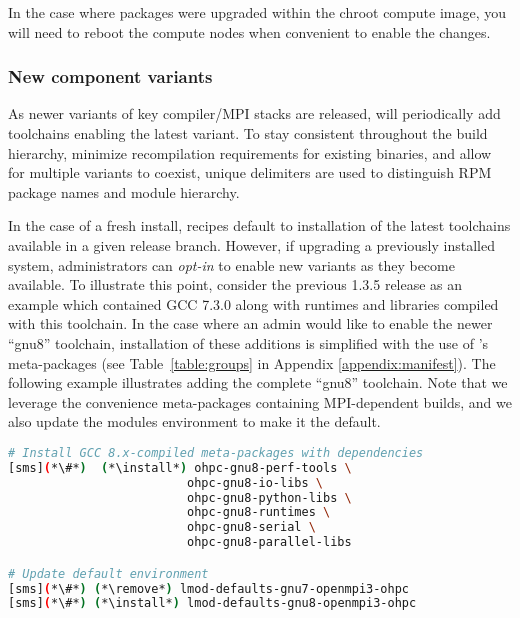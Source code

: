 \noindent In the case where packages were upgraded within the chroot compute image,
you will need to reboot the compute nodes when convenient to enable the
changes.

\subsubsection{New component variants}

As newer variants of key compiler/MPI stacks are released, \OHPC{} will
periodically add toolchains enabling the latest variant. To stay consistent
throughout the build hierarchy, minimize recompilation requirements for existing
binaries, and allow for multiple variants to coexist, unique delimiters are
used to distinguish RPM package names and module hierarchy.

In the case of a fresh install, \OHPC{} recipes default to installation of the
latest toolchains available in a given release branch. However, if upgrading a
previously installed system, administrators can {\em opt-in} to enable new
variants as they become available. To illustrate this point, consider the
previous \OHPC{} 1.3.5 release as an example which contained GCC 7.3.0
along with runtimes and libraries compiled with this toolchain.  In the case
where an admin would like to enable the newer {``gnu8''} toolchain,
installation of these additions is simplified with the use of \OHPC{}'s
meta-packages (see Table~\ref{table:groups} in Appendix
\ref{appendix:manifest}).  The following example illustrates adding the
complete ``gnu8'' toolchain.  Note that we leverage the convenience
meta-packages containing MPI-dependent builds, and we also update the
modules environment to make it the default.

\begin{lstlisting}[language=bash,keywords={}]
# Install GCC 8.x-compiled meta-packages with dependencies
[sms](*\#*)  (*\install*) ohpc-gnu8-perf-tools \
                         ohpc-gnu8-io-libs \
                         ohpc-gnu8-python-libs \
                         ohpc-gnu8-runtimes \
                         ohpc-gnu8-serial \
                         ohpc-gnu8-parallel-libs

# Update default environment
[sms](*\#*) (*\remove*) lmod-defaults-gnu7-openmpi3-ohpc
[sms](*\#*) (*\install*) lmod-defaults-gnu8-openmpi3-ohpc

\end{lstlisting}

